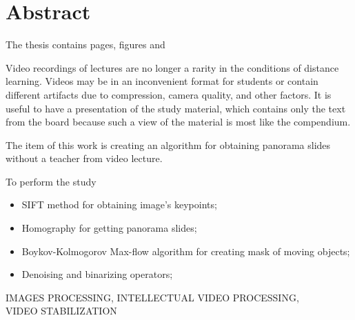 \chapter*{Abstract}

The thesis contains 
pages,
figures
and 

Video recordings of lectures are no longer a rarity in 
the conditions of distance learning. 
Videos may be in an inconvenient format for 
students or contain different artifacts due 
to compression, camera quality, and other factors. 
It is useful to have a presentation of the study material, 
which contains only the text from the board 
because such a view of the material is most 
like the compendium. 

The item of this work 
is creating an algorithm for obtaining panorama 
slides without a teacher from video lecture.

To perform the study
\begin{itemize}
  \item
    SIFT method for obtaining image's keypoints;
  \item 
    Homography for getting panorama slides;
  \item 
    Boykov-Kolmogorov Max-flow algorithm for creating mask of
    moving objects;
  \item
    Denoising and binarizing operators;
\end{itemize}

\MakeUppercase{images processing, intellectual video 
processing, \\ 
video stabilization}
